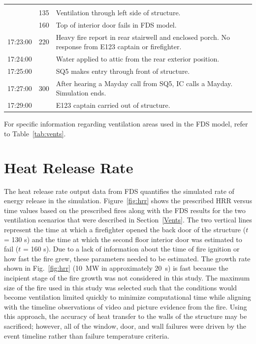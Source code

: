 \documentclass[12pt,oneside]{book}
\begin{document}
\begin{table}
\begin{tabular}{ccl}
        &  & \\[.25cm]
        & 135 & Ventilation through left side of structure. \\[.25cm] 
        & 160 & Top of interior door fails in FDS model. \\[.25cm] 
\multirow{3}{*}{17:23:00}    & \multirow{3}{*}{220} & \multirow{3}{*}{\parbox{8cm} {Heavy fire report in rear stairwell and enclosed porch. No response from E123 captain or firefighter.}} \\
         & & \\[.25cm]
         & & \\[.25cm]  
17:24:00    &   & Water applied to attic from the rear exterior position. \\[.25cm]
17:25:00    &   & SQ5 makes entry through front of structure. \\[.25cm]
\multirow{2}{*}{17:27:00}    & \multirow{2}{*}{300}  & \multirow{2}{*}{\parbox{8cm} {After hearing a Mayday call from SQ5, IC calls a Mayday. Simulation ends.}}\\
         & &  \\[.25cm]
17:29:00    &   & E123 captain carried out of structure. \\
\bottomrule[1.25pt]
\end{tabular}\par
\footnotesize
For specific information regarding ventilation areas used in the FDS model, refer to Table~\ref{tab:vents}.
\normalsize
\end{table}


\section{Heat Release Rate}
\label{HRR}
The heat release rate output data from FDS quantifies the simulated rate of energy release in the simulation. Figure~\ref{fig:hrr} shows the prescribed HRR versus time values based on the prescribed fires along with the FDS results for the two ventilation scenarios that were described in Section~\ref{Vents}. The two vertical lines represent the time at which a firefighter opened the back door of the structure ($t$ = 130 s) and the time at which the second floor interior door was estimated to fail ($t$ = 160 s). Due to a lack of information about the time of fire ignition or how fast the fire grew, these parameters needed to be estimated.  The growth rate shown in Fig.~\ref{fig:hrr} (10~MW in approximately 20~s) is fast because the incipient stage of the fire growth was not considered in this study. The maximum size of the fire used in this study was selected such that the conditions would become ventilation limited quickly to minimize computational time while aligning with the timeline observations of video and picture evidence from the fire. Using this approach, the accuracy of heat transfer to the walls of the structure may be sacrificed; however, all of the window, door, and wall failures were driven by the event timeline rather than failure temperature criteria.
\end{document}
